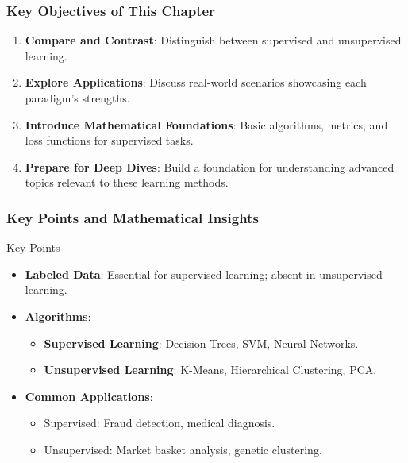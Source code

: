\documentclass[aspectratio=169]{beamer}
\begin{document}
\begin{frame}[fragile]
    \frametitle{Key Objectives of This Chapter}
    \begin{enumerate}
        \item \textbf{Compare and Contrast}: Distinguish between supervised and unsupervised learning.
        \item \textbf{Explore Applications}: Discuss real-world scenarios showcasing each paradigm's strengths.
        \item \textbf{Introduce Mathematical Foundations}: Basic algorithms, metrics, and loss functions for supervised tasks.
        \item \textbf{Prepare for Deep Dives}: Build a foundation for understanding advanced topics relevant to these learning methods.
    \end{enumerate}
\end{frame}

\begin{frame}[fragile]
    \frametitle{Key Points and Mathematical Insights}
    \begin{block}{Key Points}
        \begin{itemize}
            \item \textbf{Labeled Data}: Essential for supervised learning; absent in unsupervised learning.
            \item \textbf{Algorithms}:
                \begin{itemize}
                    \item \textbf{Supervised Learning}: Decision Trees, SVM, Neural Networks.
                    \item \textbf{Unsupervised Learning}: K-Means, Hierarchical Clustering, PCA.
                \end{itemize}
            \item \textbf{Common Applications}:
                \begin{itemize}
                    \item Supervised: Fraud detection, medical diagnosis.
                    \item Unsupervised: Market basket analysis, genetic clustering.
                \end{itemize}
        \end{itemize}
    \end{block}
\end{frame}
\end{document}
